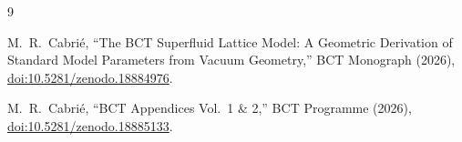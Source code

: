 \documentclass[aps,prl,preprint,superscriptaddress,floatfix]{revtex4-2}
\begin{document}
\begin{thebibliography}{9}

M.~R.~Cabri\'{e},
``The BCT Superfluid Lattice Model: A Geometric Derivation of Standard Model
Parameters from Vacuum Geometry,''
BCT Monograph (2026),
\href{https://doi.org/10.5281/zenodo.18884976}{doi:10.5281/zenodo.18884976}.

M.~R.~Cabri\'{e},
``BCT Appendices Vol.~1 \& 2,''
BCT Programme (2026),
\href{https://doi.org/10.5281/zenodo.18885133}{doi:10.5281/zenodo.18885133}.

\end{thebibliography}
\end{document}
